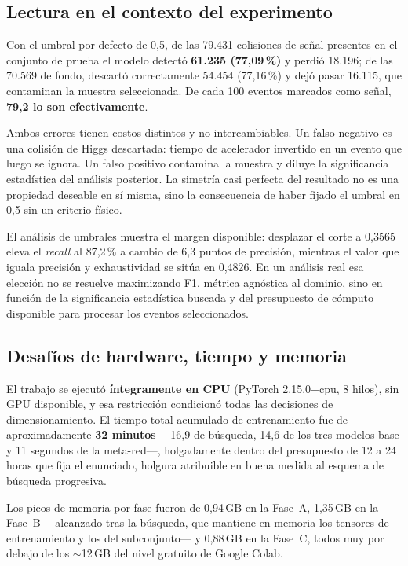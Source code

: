 \documentclass[12pt,a4paper]{article}
\begin{document}
\subsection{Lectura en el contexto del experimento}

Con el umbral por defecto de 0,5, de las 79.431 colisiones de señal presentes en el conjunto de
prueba el modelo detectó \textbf{61.235 (77,09\,\%)} y perdió 18.196; de las 70.569 de fondo,
descartó correctamente 54.454 (77,16\,\%) y dejó pasar 16.115, que contaminan la muestra
seleccionada. De cada 100 eventos marcados como señal, \textbf{79,2 lo son efectivamente}.

Ambos errores tienen costos distintos y no intercambiables. Un falso negativo es una colisión de
Higgs descartada: tiempo de acelerador invertido en un evento que luego se ignora. Un falso
positivo contamina la muestra y diluye la significancia estadística del análisis posterior. La
simetría casi perfecta del resultado no es una propiedad deseable en sí misma, sino la
consecuencia de haber fijado el umbral en 0,5 sin un criterio físico.

El análisis de umbrales muestra el margen disponible: desplazar el corte a 0,3565 eleva el
\emph{recall} al 87,2\,\% a cambio de 6,3 puntos de precisión, mientras el valor que iguala
precisión y exhaustividad se sitúa en 0,4826. En un análisis real esa elección no se resuelve
maximizando F1, métrica agnóstica al dominio, sino en función de la significancia estadística
buscada y del presupuesto de cómputo disponible para procesar los eventos seleccionados.

\subsection{Desafíos de hardware, tiempo y memoria}

El trabajo se ejecutó \textbf{íntegramente en CPU} (PyTorch 2.15.0+cpu, 8 hilos), sin GPU
disponible, y esa restricción condicionó todas las decisiones de dimensionamiento. El tiempo total
acumulado de entrenamiento fue de aproximadamente \textbf{32 minutos} ---16,9 de búsqueda, 14,6 de
los tres modelos base y 11 segundos de la meta-red---, holgadamente dentro del presupuesto de 12 a
24 horas que fija el enunciado, holgura atribuible en buena medida al esquema de búsqueda
progresiva.

Los picos de memoria por fase fueron de 0,94\,GB en la Fase~A, 1,35\,GB en la Fase~B ---alcanzado
tras la búsqueda, que mantiene en memoria los tensores de entrenamiento y los del subconjunto--- y
0,88\,GB en la Fase~C, todos muy por debajo de los $\sim$12\,GB del nivel gratuito de Google
Colab.
\end{document}
